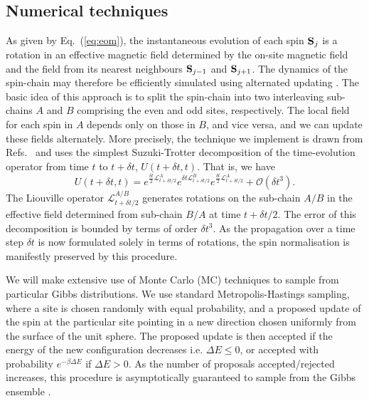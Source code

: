 \documentclass[aps,pre,twocolumn,notitlepage,floats,10pt]{revtex4-1}
\newcommand{\be}{\begin{equation}}
\newcommand{\ee}{\end{equation}}
\begin{document}
\subsection{Numerical techniques}\label{sec:numerical-simulation}
As given by Eq.~(\ref{eq:eom}), the instantaneous evolution of each spin ${\bf
S}_j$ is a rotation in an effective magnetic field determined by the on-site
magnetic field and the field from its nearest neighbours ${\bf S}_{j-1}$ and
${\bf S}_{j+1}$.
The dynamics of the spin-chain may therefore be efficiently simulated using
alternated updating \cite{Jin-et-al}.
The basic idea of this approach is to split the spin-chain into two interleaving
sub-chains $A$ and $B$ comprising the even and odd sites, respectively.
The local field for each spin in $A$ depends only on those in $B$, and vice
versa, and we can update these fields alternately.
More precisely, the technique we implement is drawn from
Refs.~\cite{Jin-et-al,Krech-Bunker-Landau} and uses the simplest
Suzuki-Trotter decomposition of the time-evolution operator from time $t$ to
$t+\delta t$, $U(t+\delta t, t)$.
That is, we have
\be
U(t+\delta t, t)
=
e^{\frac{\delta t}{2} \mathcal{L}^A_{t+\delta t/2}}
e^{\delta t \mathcal{L}^B_{t+\delta t/2}}
e^{\frac{\delta t}{2} \mathcal{L}^A_{t+\delta t/2}}
+\mathcal{O}(\delta t^3)
.
\ee
The Liouville operator $\mathcal{L}^{A/B}_{t+\delta t/2}$ generates rotations on
the sub-chain $A/B$ in the effective field determined from sub-chain $B/A$ at
time $t+\delta t/2$.
The error of this decomposition is bounded by terms of order $\delta t^3$.
As the propagation over a time step $\delta t$ is now formulated solely in
terms of rotations, the spin normalisation is manifestly preserved by this
procedure.

We will make extensive use of Monte Carlo (MC) techniques to sample from
particular Gibbs distributions.
We use standard Metropolis-Hastings sampling, where a site is chosen randomly
with equal probability, and a proposed update of the spin at the particular
site pointing in a new direction chosen uniformly from the surface of the unit
sphere.
The proposed update is then accepted if the energy of the new configuration
decreases i.e. $\Delta E \leq 0$, or accepted with probability 
$e^{-\beta \Delta E}$ if $\Delta E > 0$.
As the number of proposals accepted/rejected increases, this procedure is
asymptotically guaranteed to sample from the Gibbs ensemble 
\cite{Newman-Barkema}.
\end{document}
